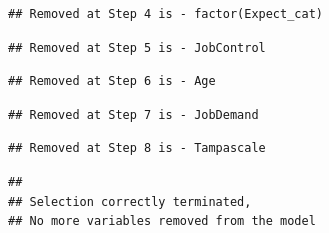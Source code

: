 \documentclass[
]{book}
\newenvironment{Shaded}{\begin{snugshade}}{\end{snugshade}}
\newcommand{\NormalTok}[1]{#1}
\newcommand{\OperatorTok}[1]{\textcolor[rgb]{0.81,0.36,0.00}{\textbf{#1}}}
\begin{document}
\begin{verbatim}
## Removed at Step 4 is - factor(Expect_cat)
\end{verbatim}

\begin{verbatim}
## Removed at Step 5 is - JobControl
\end{verbatim}

\begin{verbatim}
## Removed at Step 6 is - Age
\end{verbatim}

\begin{verbatim}
## Removed at Step 7 is - JobDemand
\end{verbatim}

\begin{verbatim}
## Removed at Step 8 is - Tampascale
\end{verbatim}

\begin{verbatim}
## 
## Selection correctly terminated, 
## No more variables removed from the model
\end{verbatim}

\begin{Shaded}
\end{Shaded}
\end{document}
